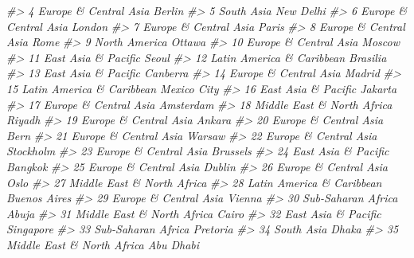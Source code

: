 \documentclass[
  xelatex, ja=standard]{bxjsbook}
\newenvironment{Shaded}{\begin{snugshade}}{\end{snugshade}}
\newcommand{\CommentTok}[1]{\textcolor[rgb]{0.56,0.35,0.01}{\textit{#1}}}
\theoremstyle{definition}
\theoremstyle{definition}
\theoremstyle{definition}
\theoremstyle{definition}
\theoremstyle{remark}
\begin{document}
\begin{Shaded}
\begin{Highlighting}[]
\CommentTok{\#\textgreater{} 4        Europe \& Central Asia              Berlin}
\CommentTok{\#\textgreater{} 5                   South Asia           New Delhi}
\CommentTok{\#\textgreater{} 6        Europe \& Central Asia              London}
\CommentTok{\#\textgreater{} 7        Europe \& Central Asia               Paris}
\CommentTok{\#\textgreater{} 8        Europe \& Central Asia                Rome}
\CommentTok{\#\textgreater{} 9                North America              Ottawa}
\CommentTok{\#\textgreater{} 10       Europe \& Central Asia              Moscow}
\CommentTok{\#\textgreater{} 11         East Asia \& Pacific               Seoul}
\CommentTok{\#\textgreater{} 12   Latin America \& Caribbean            Brasilia}
\CommentTok{\#\textgreater{} 13         East Asia \& Pacific            Canberra}
\CommentTok{\#\textgreater{} 14       Europe \& Central Asia              Madrid}
\CommentTok{\#\textgreater{} 15   Latin America \& Caribbean         Mexico City}
\CommentTok{\#\textgreater{} 16         East Asia \& Pacific             Jakarta}
\CommentTok{\#\textgreater{} 17       Europe \& Central Asia           Amsterdam}
\CommentTok{\#\textgreater{} 18  Middle East \& North Africa              Riyadh}
\CommentTok{\#\textgreater{} 19       Europe \& Central Asia              Ankara}
\CommentTok{\#\textgreater{} 20       Europe \& Central Asia                Bern}
\CommentTok{\#\textgreater{} 21       Europe \& Central Asia              Warsaw}
\CommentTok{\#\textgreater{} 22       Europe \& Central Asia           Stockholm}
\CommentTok{\#\textgreater{} 23       Europe \& Central Asia            Brussels}
\CommentTok{\#\textgreater{} 24         East Asia \& Pacific             Bangkok}
\CommentTok{\#\textgreater{} 25       Europe \& Central Asia              Dublin}
\CommentTok{\#\textgreater{} 26       Europe \& Central Asia                Oslo}
\CommentTok{\#\textgreater{} 27  Middle East \& North Africa                    }
\CommentTok{\#\textgreater{} 28   Latin America \& Caribbean        Buenos Aires}
\CommentTok{\#\textgreater{} 29       Europe \& Central Asia              Vienna}
\CommentTok{\#\textgreater{} 30          Sub{-}Saharan Africa               Abuja}
\CommentTok{\#\textgreater{} 31  Middle East \& North Africa               Cairo}
\CommentTok{\#\textgreater{} 32         East Asia \& Pacific           Singapore}
\CommentTok{\#\textgreater{} 33          Sub{-}Saharan Africa            Pretoria}
\CommentTok{\#\textgreater{} 34                  South Asia               Dhaka}
\CommentTok{\#\textgreater{} 35  Middle East \& North Africa           Abu Dhabi}

\end{Highlighting}
\end{Shaded}
\end{document}
